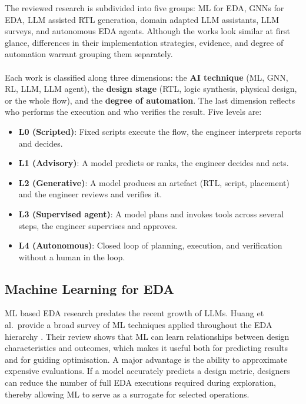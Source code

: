\documentclass[conference]{IEEEtran}
\begin{document}
The reviewed research is subdivided into five groups: ML for EDA, GNNs for EDA, LLM assisted RTL generation, domain adapted LLM assistants, LLM surveys, and autonomous EDA agents. Although the works look similar at first glance, differences in their implementation strategies, evidence, and degree of automation warrant grouping them separately.
\\\\
Each work is classified along three dimensions: the \textbf{AI technique} (ML, GNN, RL, LLM, LLM agent), the \textbf{design stage} (RTL, logic synthesis, physical design, or the whole flow), and the \textbf{degree of automation}. The last dimension reflects who performs the execution and who verifies the result. Five levels are: 
\begin{itemize}
    \item \textbf{L0 (Scripted)}: Fixed scripts execute the flow, the engineer interprets reports and decides.
    \item \textbf{L1 (Advisory)}: A model predicts or ranks, the engineer decides and acts.
    \item \textbf{L2 (Generative)}: A model produces an artefact (RTL, script, placement) and the engineer reviews and verifies it.
    \item \textbf{L3 (Supervised agent)}: A model plans and invokes tools across several steps, the engineer supervises and approves.
    \item \textbf{L4 (Autonomous)}: Closed loop of planning, execution, and verification without a human in the loop.
\end{itemize}


\subsection{Machine Learning for EDA} \label{L1}

\noindent ML based EDA research predates the recent growth of LLMs. Huang et al.\ provide a broad survey of ML techniques applied throughout the EDA hierarchy \cite{P1_Huang2021}. Their review shows that ML can learn relationships between design characteristics and outcomes, which makes it useful both for predicting results and for guiding optimisation. A major advantage is the ability to approximate expensive evaluations. If a model accurately predicts a design metric, designers can reduce the number of full EDA executions required during exploration, thereby allowing ML to serve as a surrogate for selected operations.\\
\end{document}
